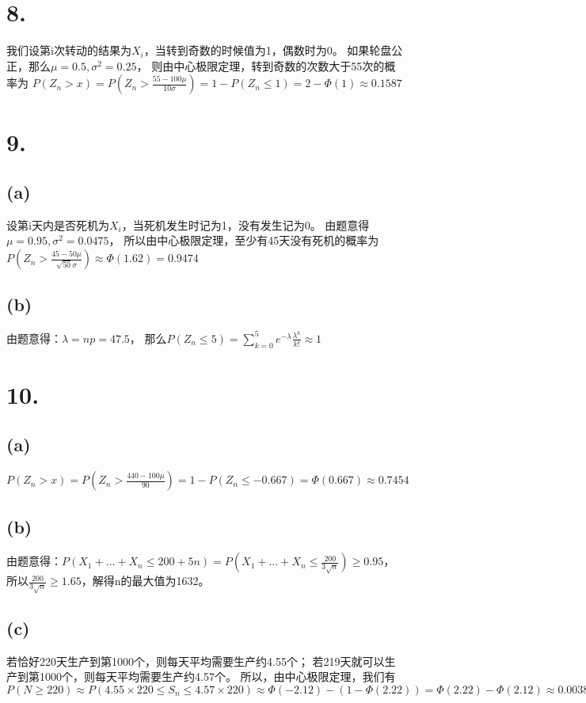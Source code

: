 \documentclass[UTF8]{report}
\begin{document}
    \section*{8.}
        我们设第i次转动的结果为$X_i$，当转到奇数的时候值为1，偶数时为0。
        如果轮盘公正，那么$\mu = 0.5, \sigma^2 = 0.25$，
        则由中心极限定理，转到奇数的次数大于55次的概率为
        $P(Z_n > x) = P(Z_n > \frac{55 - 100\mu}{10\sigma}) = 1 - P(Z_n \leq 1) = 2 - \Phi(1) \approx 0.1587$
    \section*{9.}
        \subsection*{(a)}
            设第i天内是否死机为$X_i$，当死机发生时记为1，没有发生记为0。
            由题意得$\mu = 0.95, \sigma^2 = 0.0475$，
            所以由中心极限定理，至少有45天没有死机的概率为
            $P(Z_n > \frac{45 - 50\mu}{\sqrt{50}\sigma}) \approx \Phi(1.62) = 0.9474$
        \subsection*{(b)}
            由题意得：$\lambda = np = 47.5$，
            那么$P(Z_n \leq 5) = \sum_{k = 0}^{5}e^{-\lambda}\frac{\lambda^k}{k!} \approx 1$
    \section*{10.}
        \subsection*{(a)}
            $P(Z_n > x) = P(Z_n > \frac{440 - 100\mu}{90}) = 1 - P(Z_n \leq -0.667) = \Phi(0.667) \approx 0.7454$
        \subsection*{(b)}
            由题意得：$P(X_1 + \dots + X_n \leq 200 + 5n) = P(X_1 + \dots + X_n \leq \frac{200}{3\sqrt{n}}) \geq 0.95$，
            所以$\frac{200}{3\sqrt{n}} \geq 1.65$，解得n的最大值为1632。
        \subsection*{(c)}
            若恰好220天生产到第1000个，则每天平均需要生产约4.55个；
            若219天就可以生产到第1000个，则每天平均需要生产约4.57个。
            所以，由中心极限定理，我们有
            $P(N \geq 220) \approx 
            P(4.55 \times 220 \leq S_n \leq 4.57 \times 220) \approx 
            \Phi(-2.12) - (1 - \Phi(2.22)) = \Phi(2.22) - \Phi(2.12) \approx 0.0038$
\end{document}
